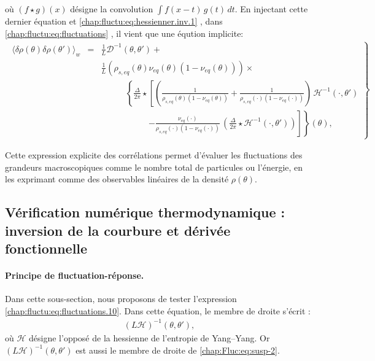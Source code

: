 où \( (f \star g)(x) \) désigne la convolution \( \int f(x - t)\, g(t)\, dt \).
En injectant cette dernier équation et \eqref{chap:fluctu:eq:hessienner.inv.1} , dans \eqref{chap:fluctu:eq:fluctuations} , il vient que une éqution implicite:
\begin{eqnarray}
	\left . \begin{array}{rcl}
		\langle \delta \rho(\theta) \delta	\rho(\theta') \rangle_w & = &\displaystyle \frac{1}{L} \mathcal{D}^{-1}(\theta , \theta') + \\&& 	\frac{1}{L} (\rho_{\! s , eq}(\theta) \nu_{\! eq}(\theta) (1 -  \nu_{\! eq}(\theta) )) \times \\
		&& \displaystyle  ~~~~~~~~~~~~~\left \{  \frac{\Delta}{2\pi} \star  \left [ \left (  \frac{1}{\rho_{\! s, eq}(\theta)  (1 - \nu_{\! eq}(\theta)  )} +  \frac{1}{\rho_{\! s, eq}(\cdot) (1 - \nu_{\! eq} (\cdot )  )}\right )  \, \mathcal{H}^{-1}( \cdot , \theta ' )   \right. \right .\\
		&&  \displaystyle  ~~~~~~~~~~~~~~~~~~~~~~~~~\left . \left .   -  \frac{\nu_{\! eq}(\cdot)}{\rho_{\! s, eq}(\cdot) ( 1 - \nu_{\! eq}(\cdot) )}  \, \left ( \frac{\Delta}{2\pi} \star \mathcal{H}^{-1}( \cdot , \theta ' )   \right )  \right ] \right \} (\theta),
	\end{array}\right\} \label{chap:fluctu:eq:fluctuations.10}
\end{eqnarray}


Cette expression explicite des corrélations permet d'évaluer les fluctuations des grandeurs macroscopiques comme le nombre total de particules ou l'énergie, en les exprimant comme des observables linéaires de la densité \( \rho(\theta) \).

\subsection{Vérification numérique thermodynamique : inversion de la courbure et dérivée fonctionnelle}


\paragraph{Principe de fluctuation-réponse.}

Dans cette sous-section, nous proposons de tester l’expression \eqref{chap:fluctu:eq:fluctuations.10}.  
Dans cette équation, le membre de droite s’écrit :
\begin{eqnarray*}
\left( L \mathcal{H} \right)^{-1} (\theta, \theta'),
\end{eqnarray*}
où $\mathcal{H}$ désigne l’opposé de la hessienne de l'entropie de Yang–Yang.  
Or $\left( L \mathcal{H} \right)^{-1} (\theta, \theta')$ est aussi le membre de droite de \eqref{chap:Fluc:eq:susp-2}.

